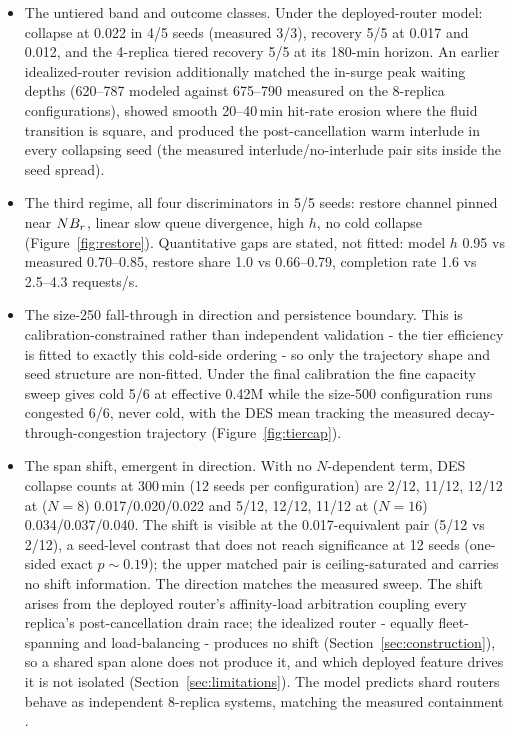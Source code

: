 \begin{itemize}
\item The untiered band and outcome classes. Under the deployed-router
  model: collapse at 0.022 in 4/5 seeds (measured 3/3), recovery 5/5
  at 0.017 and 0.012, and the 4-replica tiered recovery 5/5 at its
  180-min horizon. An earlier idealized-router revision additionally
  matched the in-surge peak waiting depths (620--787 modeled against
  675--790 measured on the 8-replica configurations), showed smooth
  20--40\,min hit-rate erosion where the fluid transition is square,
  and produced the post-cancellation warm interlude in every
  collapsing seed (the measured interlude/no-interlude pair sits
  inside the seed spread).
\item The third regime, all four discriminators in 5/5 seeds: restore
  channel pinned near $N B_r$, linear slow queue divergence, high $h$,
  no cold collapse (Figure~\ref{fig:restore}). Quantitative gaps are stated, not
  fitted: model $h$ 0.95 vs measured 0.70--0.85, restore share 1.0 vs
  0.66--0.79, completion rate 1.6 vs 2.5--4.3 requests/s.
\item The size-250 fall-through in direction and persistence boundary.
  This is calibration-constrained rather than independent
  validation - the tier efficiency is fitted to exactly this
  cold-side ordering - so only the trajectory shape and seed
  structure are non-fitted. Under the final calibration the fine
  capacity sweep gives cold 5/6 at effective 0.42M while the
  size-500 configuration runs congested 6/6, never cold, with the
  DES mean tracking the measured decay-through-congestion
  trajectory (Figure~\ref{fig:tiercap}).
\item The span shift, emergent in direction. With no $N$-dependent term,
  DES collapse counts at 300\,min (12 seeds per configuration) are
  2/12, 11/12, 12/12 at ($N{=}8$) 0.017/0.020/0.022 and 5/12, 12/12,
  11/12 at ($N{=}16$) 0.034/0.037/0.040. The shift is visible at the
  0.017-equivalent pair (5/12 vs 2/12), a seed-level contrast that
  does not reach significance at 12 seeds (one-sided exact $p \sim
  0.19$); the upper matched pair is ceiling-saturated and carries no
  shift information. The direction matches the measured sweep. The
  shift arises from the deployed router's affinity-load arbitration
  coupling every replica's post-cancellation drain race; the
  idealized router - equally fleet-spanning and load-balancing -
  produces no shift (Section~\ref{sec:construction}), so a shared span alone does not
  produce it, and which deployed feature drives it is not isolated
  (Section~\ref{sec:limitations}). The model predicts shard routers behave as
  independent 8-replica systems, matching the measured containment
  .
\end{itemize}

